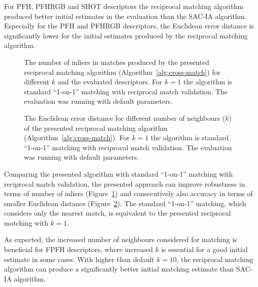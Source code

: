 For \gls{PFH}, \gls{PFHRGB} and \gls{SHOT} descriptors the reciprocal matching algorithm produced better initial estimates in the evaluation than the \gls{SAC-IA} algorithm. Especially for the \gls{PFH} and \gls{PFHRGB} descriptors, the Euclidean error distance is significantly lower for the initial estimates produced by the reciprocal matching algorithm.

\begin{figure}
  \centering
  
  \caption[The number of inliers per $k$ in the reciprocal matching algorithm]{The number of inliers in matches produced by the presented reciprocal matching algorithm (Algorithm~\ref{alg:cross-match}) for different $k$ and the evaluated descriptors. For $k=1$ the algorithm is standard ``1-on-1'' matching with reciprocal match validation. The evaluation was running with default parameters.}
  \label{fig:plot:matching_k_inliers}
\end{figure}

\begin{figure}
  \centering
  
  \caption[The Euclidean distance per $k$ in the reciprocal matching algorithm]{The Euclidean error distance for different number of neighbours ($k$) of the presented reciprocal matching algorithm (Algorithm~\ref{alg:cross-match}). For $k=1$ the algorithm is standard ``1-on-1'' matching with reciprocal match validation. The evaluation was running with default parameters.}
  \label{fig:plot:matching_k_dist}
\end{figure}

Comparing the presented algorithm with standard ``1-on-1'' matching with reciprocal match validation, the presented approach can improve robustness in terms of number of inliers (Figure~\ref{fig:plot:matching_k_inliers}) and consecutively also accuracy in terms of smaller Euclidean distance (Figure~\ref{fig:plot:matching_k_dist}). The standard ``1-on-1'' matching, which considers only the nearest match, is equivalent to the presented reciprocal matching with $k=1$.

As expected, the increased number of neighbours considered for matching is beneficial for \gls{FPFH} descriptors, where increased $k$ is essential for a good initial estimate in some cases. With higher than default $k=10$, the reciprocal matching algorithm can produce a significantly better initial matching estimate than \gls{SAC-IA} algorithm.


